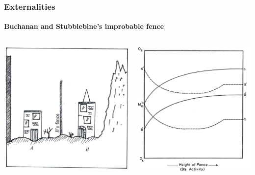 \documentclass[handout, notes=hide]{beamer}
\begin{document}
\begin{frame}
\frametitle{Externalities}
\framesubtitle{Buchanan and Stubblebine's improbable fence}
\begin{columns}[T]
\begin{column}[T]{0.5\textwidth}
\includegraphics[width=\textwidth]{fence-actors}
\end{column}
\begin{column}[T]{0.5\textwidth}
\includegraphics[width=\textwidth]{fence-graphnolines}
\end{column}
\end{columns}

\end{frame}
\end{document}
